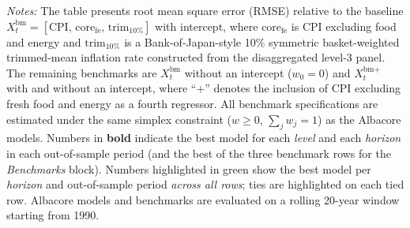 \begin{table}[ht]
\begin{threeparttable}
\begin{tablenotes}[flushleft]
\footnotesize
\item \textit{Notes:} The table presents root mean square error (RMSE) relative to the baseline $X^{\text{bm}}_t = [\text{CPI},\,\text{core}_{\text{fe}},\,\text{trim}_{10\%}]$ with intercept, where $\text{core}_{\text{fe}}$ is CPI excluding food and energy and $\text{trim}_{10\%}$ is a Bank-of-Japan-style 10\% symmetric basket-weighted trimmed-mean inflation rate constructed from the disaggregated level-3 panel. The remaining benchmarks are $X^{\text{bm}}_t$ without an intercept ($w_0 = 0$) and $X^{\text{bm}+}_t$ with and without an intercept, where ``$+$'' denotes the inclusion of CPI excluding fresh food and energy as a fourth regressor. All benchmark specifications are estimated under the same simplex constraint ($w \ge 0$, $\sum_j w_j = 1$) as the Albacore models. Numbers in \textbf{bold} indicate the best model for each \textit{level} and each \textit{horizon} in each out-of-sample period (and the best of the three benchmark rows for the \textit{Benchmarks} block). Numbers highlighted in \textcolor{green!55!black}{green} show the best model per \textit{horizon} and out-of-sample period \textit{across all rows}; ties are highlighted on each tied row. Albacore models and benchmarks are evaluated on a rolling 20-year window starting from 1990.
\end{tablenotes}
\end{threeparttable}
\end{table}
